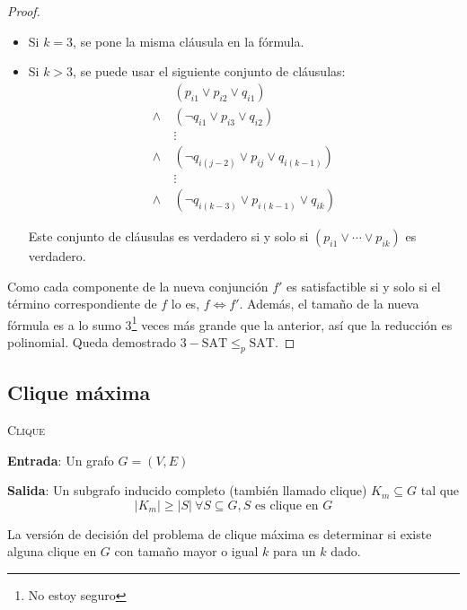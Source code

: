 \documentclass[a4paper]{report}
\begin{document}
\begin{proof}
\begin{itemize}
        \item Si $k = 3$, se pone la misma cláusula en la fórmula.
        \item Si $k > 3$, se puede usar el siguiente conjunto de cláusulas:
              \begin{align*}
                          & (p_{i1} \lor p_{i2} \lor q_{i1})                  \\
                  \land\  & (\neg q_{i1} \lor p_{i3} \lor q_{i2})             \\
                          & \vdots                                            \\
                  \land\  & (\neg q_{i(j - 2)} \lor p_{ij} \lor q_{i(k - 1)}) \\
                          & \vdots                                            \\
                  \land\  & (\neg q_{i(k - 3)} \lor p_{i(k - 1)} \lor q_{ik})
              \end{align*}

              Este conjunto de cláusulas es verdadero si y solo si $(p_{i1} \lor \cdots \lor p_{ik})$ es verdadero.
    \end{itemize}

    Como cada componente de la nueva conjunción $f'$ es satisfactible si y solo si el término correspondiente de $f$ lo es, $f \iff f'$. Además, el tamaño de la nueva fórmula es a lo sumo 3\footnote{No estoy seguro} veces más grande que la anterior, así que la reducción es polinomial. Queda demostrado $3-\text{SAT} \leq_p \text{SAT}$.

\end{proof}

\subsection{Clique máxima}
\label{clique}

\begin{problema}
    \textsc{Clique}
    \medskip

    \textbf{Entrada}: Un grafo $G = (V, E)$

    \textbf{Salida}: Un subgrafo inducido completo (también llamado clique) $K_m \subseteq G$ tal que
    $$|K_m| \geq |S|\ \forall S \subseteq G, S \text{ es clique en } G$$
\end{problema}

La versión de decisión del problema de clique máxima es determinar si existe alguna clique en $G$ con tamaño mayor o igual $k$ para un $k$ dado.
\end{document}
